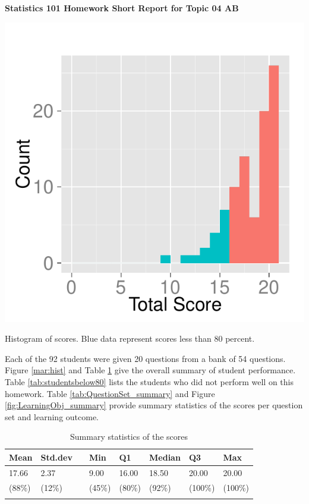 \documentclass[12pt,english,nohyper]{tufte-handout}\usepackage[]{graphicx}\usepackage[]{color}
\begin{document}
\centerline{\Large\bf Statistics 101 Homework Short Report for Topic 04 AB}
\vspace{1cm}

\begin{marginfigure}
\includegraphics[width=0.98\linewidth]{Topic04_AB_score}
\caption{\label{mar:hist}Histogram of scores. Blue data represent scores less than 80 percent.}
\end{marginfigure}

Each of the 92 students were given 20 questions from a bank of 54 questions. Figure \ref{mar:hist} and Table \ref{tab:summary} give the overall summary of student performance. Table \ref{tab:studentsbelow80} lists the students who did not perform well on this homework. Table \ref{tab:QuestionSet_summary} and Figure \ref{fig:LearningObj_summary} provide summary statistics of the scores per question set and learning outcome.
\bigskip{}

\begin{longtable}{llllllll}
  \hline
Mean & Std.dev &   & Min & Q1 & Median & Q3 & Max \\ 
  \hline
17.66 & 2.37 &  & 9.00 & 16.00 & 18.50 & 20.00 & 20.00 \\ 
  (88\%) & (12\%) &  & (45\%) & (80\%) & (92\%) & (100\%) & (100\%) \\ 
   \hline
\hline
\caption{Summary statistics of the scores} 
\label{tab:summary}
\end{longtable}
\end{document}
